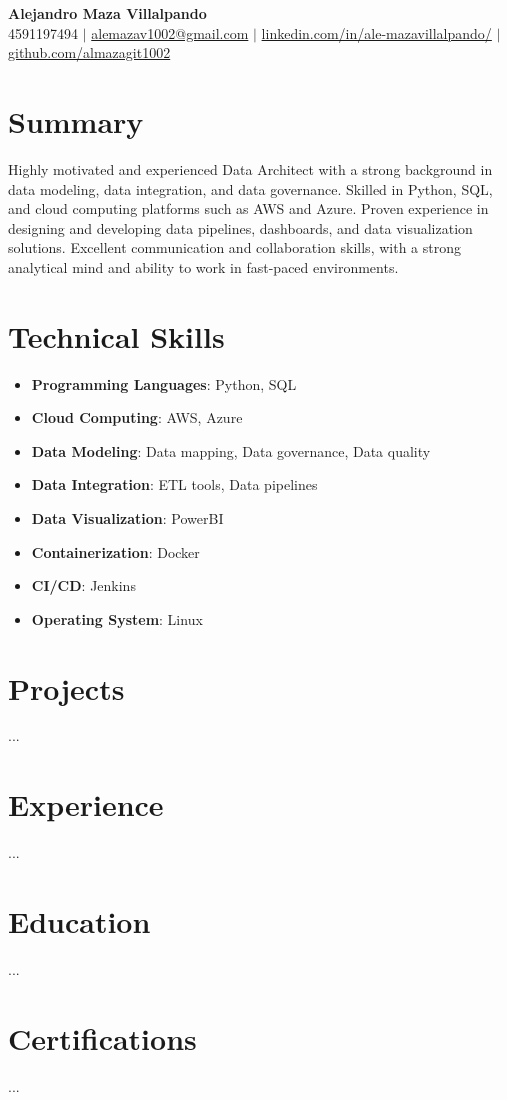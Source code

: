 \documentclass[letterpaper,10pt]{article}
\newcommand{\resumeItem}[1]{\item\small{#1}}
\newcommand{\resumeSubHeadingList}{\begin{itemize}[leftmargin=0.15in, label={}]}
\newcommand{\resumeSubHeadingListEnd}{\end{itemize}}
\begin{document}
\begin{center}
  \textbf{\Huge Alejandro Maza Villalpando} \\
  \small 4591197494 $|$ \href{mailto:alemazav1002@gmail.com}{alemazav1002@gmail.com} $|$ 
  \href{https://www.linkedin.com/in/ale-mazavillalpando/}{linkedin.com/in/ale-mazavillalpando/} $|$
  \href{https://github.com/almazagit1002}{github.com/almazagit1002}
\end{center}

\section*{Summary}
Highly motivated and experienced Data Architect with a strong background in data modeling, data integration, and data governance. Skilled in Python, SQL, and cloud computing platforms such as AWS and Azure. Proven experience in designing and developing data pipelines, dashboards, and data visualization solutions. Excellent communication and collaboration skills, with a strong analytical mind and ability to work in fast-paced environments.

\section{Technical Skills}
\resumeSubHeadingList
  \resumeItem{\textbf{Programming Languages}: Python, SQL}
  \resumeItem{\textbf{Cloud Computing}: AWS, Azure}
  \resumeItem{\textbf{Data Modeling}: Data mapping, Data governance, Data quality}
  \resumeItem{\textbf{Data Integration}: ETL tools, Data pipelines}
  \resumeItem{\textbf{Data Visualization}: PowerBI}
  \resumeItem{\textbf{Containerization}: Docker}
  \resumeItem{\textbf{CI/CD}: Jenkins}
  \resumeItem{\textbf{Operating System}: Linux}
\resumeSubHeadingListEnd

\section{Projects}
...

\section{Experience}
...

\section{Education}
...

\section{Certifications}
...
\end{document}
